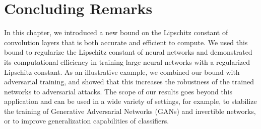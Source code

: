 \section{Concluding Remarks}
\label{section:ch5-concluding_remarks}

In this chapter, we introduced a new bound on the Lipschitz constant of convolution layers that is both accurate and efficient to compute.
We used this bound to regularize the Lipschitz constant of neural networks and demonstrated its computational efficiency in training large neural networks with a regularized Lipschitz constant.
As an illustrative example, we combined our bound with adversarial training, and showed that this increases the robustness of the trained networks to  adversarial attacks.
The scope of our results goes beyond this application and can be used in a wide variety of settings, for example, to stabilize the training of Generative Adversarial Networks (GANs) and invertible networks, or to improve generalization capabilities of classifiers.

